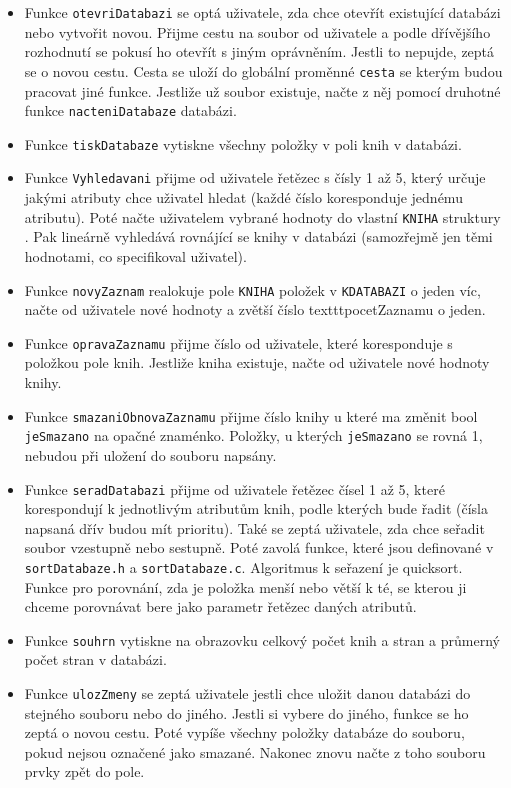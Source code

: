 \begin{itemize}
  \item Funkce \texttt{otevriDatabazi} se optá uživatele, zda chce otevřít existující databázi nebo vytvořit novou. 
  Přijme cestu na soubor od uživatele a podle dřívějšího rozhodnutí se pokusí ho otevřít s jiným oprávněním. Jestli 
  to nepujde, zeptá se o novou cestu. Cesta se uloží do globální proměnné \texttt{cesta} se kterým budou pracovat jiné 
  funkce. Jestliže už soubor existuje, načte z něj pomocí druhotné funkce \texttt{nacteniDatabaze} databázi.
  \item Funkce \texttt{tiskDatabaze} vytiskne všechny položky v poli knih v databázi.
  \item Funkce \texttt{Vyhledavani} přijme od uživatele řetězec s čísly 1 až 5, který určuje jakými atributy chce
  uživatel hledat (každé číslo koresponduje jednému atributu). Poté načte uživatelem vybrané hodnoty do vlastní
  \texttt{KNIHA} struktury . Pak lineárně vyhledává rovnájící se knihy v databázi (samozřejmě jen těmi hodnotami, co specifikoval 
  uživatel).
  \item Funkce \texttt{novyZaznam} realokuje pole \texttt{KNIHA} položek v \texttt{KDATABAZI} o jeden víc, načte od uživatele 
  nové hodnoty a zvětší číslo texttt{pocetZaznamu} o jeden.
  \item Funkce \texttt{opravaZaznamu} přijme číslo od uživatele, které koresponduje s položkou pole knih. Jestliže kniha existuje, 
  načte od uživatele nové hodnoty knihy.
  \item Funkce \texttt{smazaniObnovaZaznamu} přijme číslo knihy u které ma změnit bool \texttt{jeSmazano} na opačné znaménko. 
  Položky, u kterých \texttt{jeSmazano} se rovná 1, nebudou při uložení do souboru napsány. 
  \item Funkce \texttt{seradDatabazi} přijme od uživatele řetězec čísel 1 až 5, které korespondují k jednotlivým atributům 
    knih, podle kterých bude řadit (čísla napsaná dřív budou mít prioritu). Také se zeptá uživatele, zda chce 
    seřadit soubor vzestupně nebo sestupně. Poté zavolá funkce, které jsou definované 
    v \texttt{sortDatabaze.h} a \texttt{sortDatabaze.c}. Algoritmus k seřazení je quicksort. Funkce pro porovnání, zda je 
    položka menší nebo větší k té, se kterou ji chceme porovnávat bere jako parametr řetězec daných atributů.
  \item Funkce \texttt{souhrn} vytiskne na obrazovku celkový počet knih a stran a průmerný počet stran v databázi.
  \item Funkce \texttt{ulozZmeny} se zeptá uživatele jestli chce uložit danou databázi do stejného souboru nebo do jiného. 
  Jestli si vybere do jiného, funkce se ho zeptá o novou cestu. Poté vypíše všechny položky databáze do souboru, pokud 
  nejsou označené jako smazané. Nakonec znovu načte z toho souboru prvky zpět do pole. 
\end{itemize}


